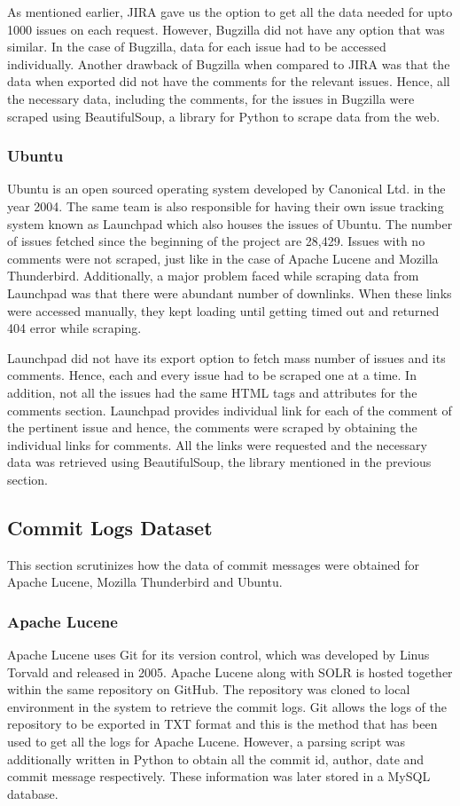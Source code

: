 \documentclass[a4paper,12pt,twoside]{report}
\begin{document}
As mentioned earlier, JIRA gave us the option to get all the data needed for upto 1000 issues on each request. However, Bugzilla did not have any option that was similar. In the case of Bugzilla, data for each issue had to be accessed individually. Another drawback of Bugzilla when compared to JIRA was that the data when exported did not have the comments for the relevant issues. Hence, all the necessary data, including the comments, for the issues in Bugzilla were scraped using BeautifulSoup, a library for Python to scrape data from the web. 

\subsubsection{Ubuntu}
Ubuntu is an open sourced operating system developed by Canonical Ltd. in the year 2004. The same team is also responsible for having their own issue tracking system known as Launchpad which also houses the issues of Ubuntu. The number of issues fetched since the beginning of the project are 28,429. Issues with no comments were not scraped, just like in the case of Apache Lucene and Mozilla Thunderbird. Additionally, a major problem faced while scraping data from Launchpad was that there were abundant number of downlinks. When these links were accessed manually, they kept loading until getting timed out and returned 404 error while scraping.

Launchpad did not have its export option to fetch mass number of issues and its comments. Hence, each and every issue had to be scraped one at a time. In addition, not all the issues had the same HTML tags and attributes for the comments section. Launchpad provides individual link for each of the comment of the pertinent issue and hence, the comments were scraped by obtaining the individual links for comments. All the links were requested and the necessary data was retrieved using BeautifulSoup, the library mentioned in the previous section.

\subsection{Commit Logs Dataset}
This section scrutinizes how the data of commit messages were obtained for Apache Lucene, Mozilla Thunderbird and Ubuntu.

\subsubsection{Apache Lucene}
Apache Lucene uses Git for its version control, which was developed by Linus Torvald and released in 2005. Apache Lucene along with SOLR is hosted together within the same repository on GitHub. The repository was cloned to local environment in the system to retrieve the commit logs. Git allows the logs of the repository to be exported in TXT format and this is the method that has been used to get all the logs for Apache Lucene. However, a parsing script was additionally written in Python to obtain all the commit id, author, date and commit message respectively. These information was later stored in a MySQL database. 
\end{document}
